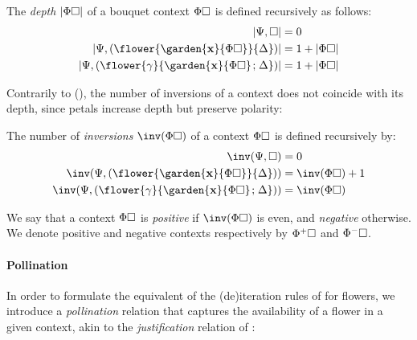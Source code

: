 \begin{definition}[Depth]
  The \emph{depth} $\left|\Phi\square\right|$ of a bouquet context $\Phi\square$ is
  defined recursively as follows:
  \begin{align*}
    \soldepth{\Psi, \hole} &= 0 \\
    \soldepth{\Psi, (\flower{\garden{\bx}{\Phi\hole}}{\Delta})} &= 1 + \soldepth{\Phi\hole} \\
    \soldepth{\Psi, (\flower{\gamma}{\garden{\bx}{\Phi\hole} \sep \Delta})} &= 1 + \soldepth{\Phi\hole}
  \end{align*}
\end{definition}

Contrarily to  (), the number of inversions of a context does
not coincide with its depth, since petals increase depth but preserve polarity:

\begin{definition}[Inversions]
  The number of \emph{inversions} $\inv(\Phi\hole)$ of a context $\Phi\square$ is
  defined recursively by:
  \begin{align*}
    \inv(\Psi, \hole) &= 0 \\
    \inv(\Psi, (\flower{\garden{\bx}{\Phi\hole}}{\Delta})) &= \inv(\Phi\hole) + 1 \\
    \inv(\Psi, (\flower{\gamma}{\garden{\bx}{\Phi\hole} \sep \Delta})) &= \inv(\Phi\hole)
  \end{align*}
\end{definition}

\begin{definition}[Polarity]
  We say that a context $\Phi\square$ is \emph{positive} if $\inv(\Phi\hole)$ is even, and
  \emph{negative} otherwise. We denote positive and negative contexts
  respectively by $\Phi^+\square$ and $\Phi^-\square$.
\end{definition}

\paragraph{Pollination}

In order to formulate the equivalent of the (de)iteration rules of  for
flowers, we introduce a \emph{pollination} relation that captures the
availability of a flower in a given context, akin to the \emph{justification}
relation of :

